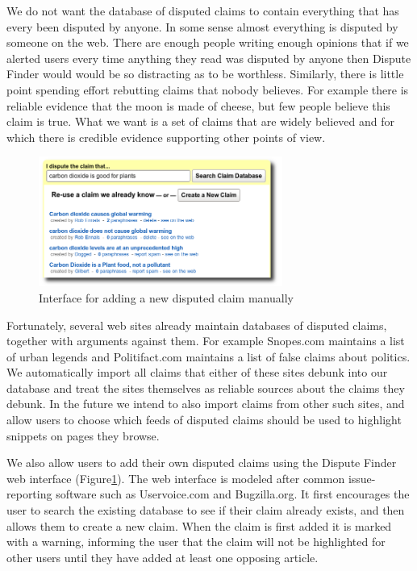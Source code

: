 \documentclass{www2010-submission}
\newcommand{\todo}[1]{}
\begin{document}
\todo{We are repeating information between here and the related work section on Recognizing Textual Entailment}

We do not want the database of disputed claims to contain everything that has every been disputed by anyone. In some sense almost everything is disputed by someone on the web. There are enough people writing enough opinions that if we alerted users every time anything they read was disputed by anyone then Dispute Finder would would be so distracting as to be worthless. Similarly, there is little point spending effort rebutting claims that nobody believes. For example there is reliable evidence that the moon is made of cheese, but few people believe this claim is true. What we want is a set of claims that are widely believed and for which there is credible evidence supporting other points of view.

\begin{figure}[tb]
	\begin{center}
	\includegraphics[width=8cm]{pictures/add_claim_list.png}
	\caption{Interface for adding a new disputed claim manually}
	\label{add_claim}
	\end{center}
\end{figure}

Fortunately, several web sites already maintain databases of disputed claims, together with arguments against them. For example Snopes.com maintains a list of urban legends and Politifact.com maintains a list of false claims about politics. We automatically import all claims that either of these sites debunk into our database and treat the sites themselves as reliable sources about the claims they debunk. In the future we intend to also import claims from other such sites, and allow users to choose which feeds of disputed claims should be used to highlight snippets on pages they browse.

We also allow users to add their own disputed claims using the Dispute Finder web interface (Figure\ref{add_claim}). The web interface is modeled after common issue-reporting software such as Uservoice.com and Bugzilla.org. It first encourages the user to search the existing database to see if their claim already exists, and then allows them to create a new claim. When the claim is first added it is marked with a warning, informing the user that the claim will not be highlighted for other users until they have added at least one opposing article.
\end{document}
